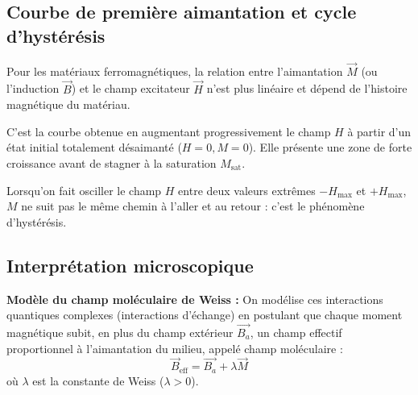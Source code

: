 \documentclass[french]{yLectureNote}
\renewcommand{\vec}{\overrightarrow}
\begin{document}

\subsection{Courbe de première aimantation et cycle d'hystérésis}

Pour les matériaux ferromagnétiques, la relation entre l'aimantation $\vec{M}$ (ou l'induction $\vec{B}$) et le champ excitateur $\vec{H}$ n'est plus linéaire et dépend de l'histoire magnétique du matériau.

\begin{definition}
    C'est la courbe obtenue en augmentant progressivement le champ $H$ à partir d'un état initial totalement désaimanté ($H=0, M=0$). Elle présente une zone de forte croissance avant de stagner à la saturation $M_{\text{sat}}$.
\end{definition}

Lorsqu'on fait osciller le champ $H$ entre deux valeurs extrêmes $-H_{\max}$ et $+H_{\max}$, $M$ ne suit pas le même chemin à l'aller et au retour : c'est le phénomène d'hystérésis.


\subsection{Interprétation microscopique}
\begin{definition}
    \textbf{Modèle du champ moléculaire de Weiss :} On modélise ces interactions quantiques complexes (interactions d'échange) en postulant que chaque moment magnétique subit, en plus du champ extérieur $\vec{B_a}$, un champ effectif proportionnel à l'aimantation du milieu, appelé champ moléculaire :
    $$\vec{B}_{\text{eff}} = \vec{B_a} + \lambda \vec{M}$$
    où $\lambda$ est la constante de Weiss ($\lambda > 0$).
\end{definition}
\end{document}
